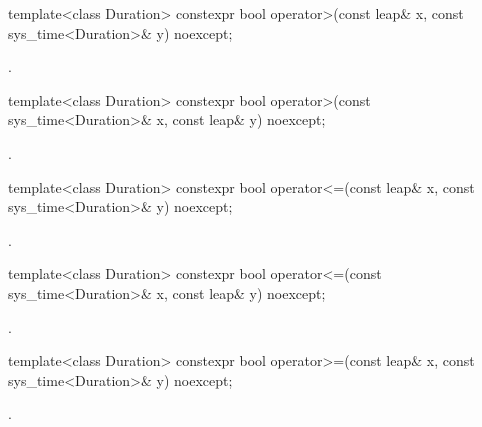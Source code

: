 %
%
\begin{itemdecl}
template<class Duration>
  constexpr bool operator>(const leap& x, const sys_time<Duration>& y) noexcept;
\end{itemdecl}

\begin{itemdescr}
\pnum
\returns
{}.
\end{itemdescr}

%
%
\begin{itemdecl}
template<class Duration>
  constexpr bool operator>(const sys_time<Duration>& x, const leap& y) noexcept;
\end{itemdecl}

\begin{itemdescr}
\pnum
\returns
{}.
\end{itemdescr}

%
%
\begin{itemdecl}
template<class Duration>
  constexpr bool operator<=(const leap& x, const sys_time<Duration>& y) noexcept;
\end{itemdecl}

\begin{itemdescr}
\pnum
\returns
{}.
\end{itemdescr}

%
%
\begin{itemdecl}
template<class Duration>
  constexpr bool operator<=(const sys_time<Duration>& x, const leap& y) noexcept;
\end{itemdecl}

\begin{itemdescr}
\pnum
\returns
{}.
\end{itemdescr}

%
%
\begin{itemdecl}
template<class Duration>
  constexpr bool operator>=(const leap& x, const sys_time<Duration>& y) noexcept;
\end{itemdecl}

\begin{itemdescr}
\pnum
\returns
{}.
\end{itemdescr}

